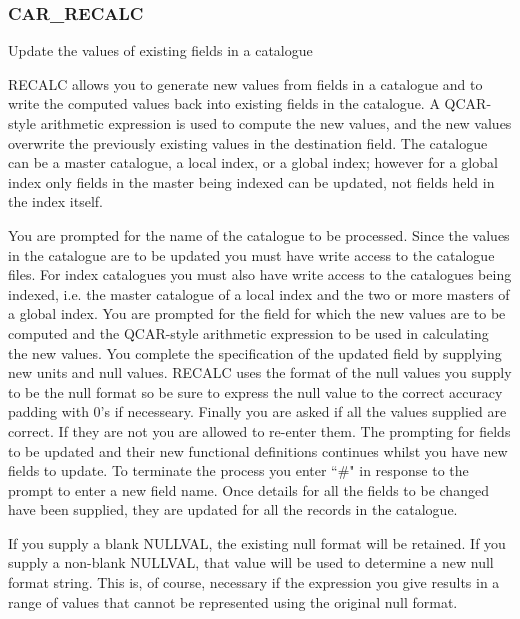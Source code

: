 \subsubsection{CAR\_RECALC}

Update the values of existing fields in a catalogue

RECALC allows you to generate new values from fields in a catalogue
and to write the computed values back into existing fields in the
catalogue.
A QCAR-style arithmetic expression is used to compute the new values, and
the new values overwrite the previously existing values in the destination
field.
The catalogue can be a master catalogue, a local index, or a global index;
however for a global index only fields in the master being indexed can be
updated, not fields held in the index itself.

You are prompted for the name of the catalogue to be processed.
Since the values in the catalogue are to be updated you must have write
access to the catalogue files.
For index catalogues you must also have write access to the catalogues
being indexed, i.e. the master catalogue of a local index and the two or more
masters of a global index.
You are prompted for the field for which the new values are to be
computed and the QCAR-style arithmetic expression to be used in calculating
the new values.
You complete the specification of the updated field by supplying new
units and null values. RECALC uses the format of the null values you supply
to be the null format so be sure to express the null value to the correct
accuracy padding with 0's if necesseary.
Finally you are asked if all the values supplied are correct.
If they are not you are allowed to re-enter them.
The prompting for fields to be updated and their new functional definitions
continues whilst you have new fields to update.
To terminate the process you enter ``\#" in response to the prompt
to enter a new field name.
Once details for all the fields to be changed have been supplied, they are
updated for all the records in the catalogue.

If you supply a blank NULLVAL, the existing null format will be retained.
If you supply a non-blank NULLVAL, that value will be used to determine a
new null format string.
This is, of course, necessary if the expression you give results in a range
of values that cannot be represented using the original null format.

